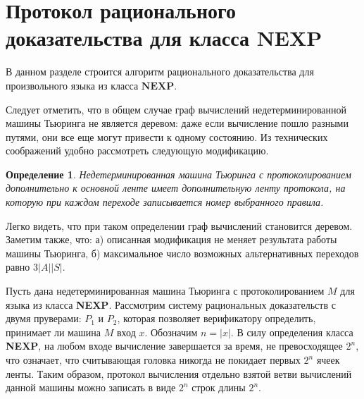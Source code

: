\documentclass[14pt, a4paper]{extreport}
\newtheorem{definition}{\indent Определение}
\begin{document}
        \section{Протокол рационального доказательства для класса $\textbf{NEXP}$}
        В данном разделе строится алгоритм рационального доказательства для произвольного языка из класса $\textbf{NEXP}$.

        Следует отметить, что в общем случае граф вычислений недетерминированной машины Тьюринга не является деревом: даже если вычисление пошло разными путями, они все еще могут привести к одному состоянию. Из технических соображений удобно рассмотреть следующую модификацию.

        \begin{definition}
            Недетерминированная машина Тьюринга с протоколированием дополнительно к основной ленте имеет дополнительную ленту протокола, на которую при каждом переходе записывается номер выбранного правила.
        \end{definition}

        Легко видеть, что при таком определении граф вычислений становится деревом. Заметим также, что: а) описанная модификация не меняет результата работы машины Тьюринга, б) максимальное число возможных альтернативных переходов равно $3|A||S|$.

        Пусть дана недетерминированная машина Тьюринга с протоколированием $M$ для языка из класса \textbf{NEXP}. Рассмотрим систему рациональных доказательств с двумя пруверами: $P_1$ и $P_2$, которая позволяет верификатору определить, принимает ли машина $M$ вход $x$. Обозначим $n = |x|$. В силу определения класса \textbf{NEXP}, на любом входе вычисление завершается за время, не превосходящее $2 ^ n$, что означает, что считывающая головка никогда не покидает первых $2^n$ ячеек ленты. Таким образом, протокол вычисления отдельно взятой ветви вычислений данной машины можно записать в виде $2^n$ строк длины $2^n$.
\end{document}
